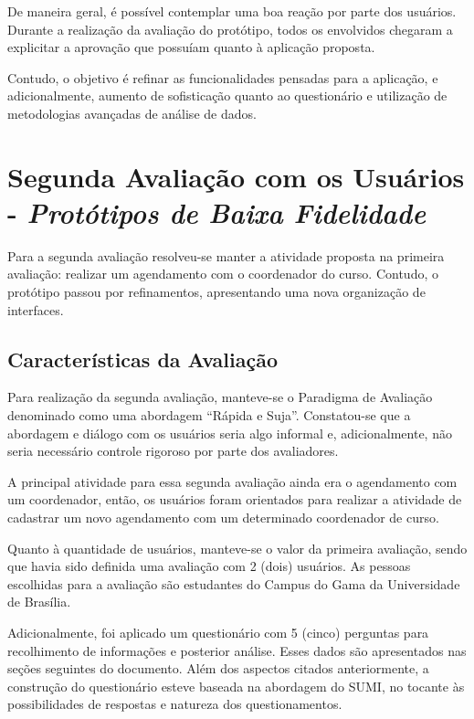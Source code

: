 			De maneira geral, é possível contemplar uma boa reação por parte dos usuários. Durante a realização da avaliação do protótipo, todos os envolvidos chegaram a explicitar a aprovação que possuíam quanto à aplicação proposta.
		
			Contudo, o objetivo é refinar as funcionalidades pensadas para a aplicação, e adicionalmente, aumento de sofisticação quanto ao questionário e utilização de metodologias avançadas de análise de dados.

	\newpage
	\section[Segunda Avaliação com os Usuários - Protótipos de Baixa Fidelidade]{Segunda Avaliação com os Usuários - \emph{Protótipos de Baixa Fidelidade}}
	\label{sec:avaliacaoPrototipos_Segunda}

		Para a segunda avaliação resolveu-se manter a atividade proposta na primeira avaliação: realizar um agendamento com o coordenador do curso. Contudo, o protótipo passou por refinamentos, apresentando uma nova organização de interfaces.

		\subsection[Características da Avaliação]{Características da Avaliação}
		\label{sec:segundaAvaliacao_Caracteristicas}

			Para realização da segunda avaliação, manteve-se o Paradigma de Avaliação denominado como uma abordagem “Rápida e Suja”. Constatou-se que a abordagem e diálogo com os usuários seria algo informal e, adicionalmente, não seria necessário controle rigoroso por parte dos avaliadores.

			A principal atividade para essa segunda avaliação ainda era o agendamento com um coordenador, então, os usuários foram orientados para realizar a atividade de cadastrar um novo agendamento com um determinado coordenador de curso.

			Quanto à quantidade de usuários, manteve-se o valor da primeira avaliação, sendo que havia sido definida uma avaliação com 2 (dois) usuários. As pessoas escolhidas para a avaliação são estudantes do Campus do Gama da Universidade de Brasília.

			Adicionalmente, foi aplicado um questionário com 5 (cinco) perguntas para recolhimento de informações e posterior análise. Esses dados são apresentados nas seções seguintes do documento. Além dos aspectos citados anteriormente, a construção do questionário esteve baseada na abordagem do SUMI, no tocante às possibilidades de respostas e natureza dos questionamentos.

